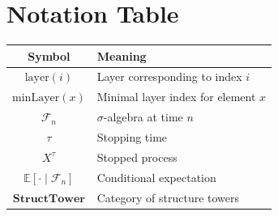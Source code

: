 \documentclass[11pt,a4paper]{article}
\theoremstyle{plain}
\theoremstyle{definition}
\newcommand{\FF}{\mathcal{F}}
\newcommand{\EE}{\mathbb{E}}
\newcommand{\StructTower}{\mathbf{StructTower}}
\newcommand{\minmark}{\mathrm{minLayer}}
\newcommand{\layer}{\mathrm{layer}}
\begin{document}
\section{Notation Table}
\label{app:notation}

\begin{center}
\begin{tabular}{cl}
\hline
Symbol & Meaning \\
\hline
$\layer(i)$ & Layer corresponding to index $i$ \\
$\minmark(x)$ & Minimal layer index for element $x$ \\
$\FF_n$ & $\sigma$-algebra at time $n$ \\
$\tau$ & Stopping time \\
$X^\tau$ & Stopped process \\
$\EE[\cdot \mid \FF_n]$ & Conditional expectation \\
$\StructTower$ & Category of structure towers \\
\hline
\end{tabular}
\end{center}
\end{document}
